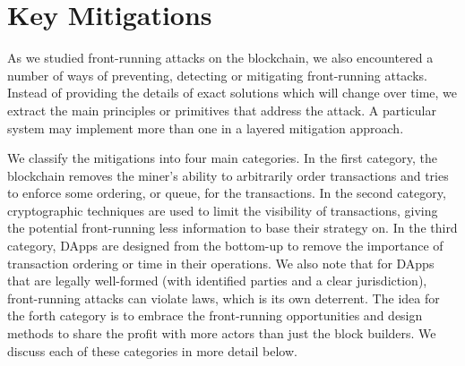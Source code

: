 

\section{Key Mitigations} %




As we studied front-running attacks on the blockchain, we also encountered a number of ways of preventing, detecting or mitigating front-running attacks. Instead of providing the details of exact solutions which will change over time, we extract the main principles or primitives that address the attack. A particular system may implement more than one in a layered mitigation approach.

We classify the mitigations into four main categories. In the first category, the blockchain removes the miner's ability to arbitrarily order transactions and tries to enforce some ordering, or queue, for the transactions. In the second category, cryptographic techniques are used to limit the visibility of transactions, giving the potential front-running less information to base their strategy on. In the third category, DApps are designed from the bottom-up to remove the importance of transaction ordering or time in their operations. We also note that for DApps that are legally well-formed (\eg with identified parties and a clear jurisdiction), front-running attacks can violate laws, which is its own deterrent. The idea for the forth category is to embrace the front-running opportunities and design methods to share the profit with more actors than just the block builders. We discuss each of these categories in more detail below.

